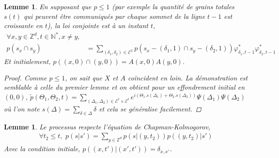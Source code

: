 \documentclass{article}
\newtheorem{lemma}[theorem]{Lemme}
\begin{document}
\begin{lemma}
	En supposant que $p\leq 1$ (par exemple la quantité de grains totales $s(t)$ qui peuvent être communiqués par chaque sommet de la ligne $t-1$ est croissante en $t$), la loi conjointe est à un instant $t$,
\begin{align*}
	\forall x, y\in \mathbb{Z}^d, t\in\mathbb{N}^*, x\neq y, \\p(s_x \cap s_y) &= \sum_{(\delta_1,\delta_2)\in \mathcal{E}^2} p(s_x-(\delta_1, 1) \cap s_y-(\delta_2,1))\varphi^*_{\delta_1,t-1}\varphi^*_{\delta_2,t-1}\label{1}\tag{1}
\end{align*} 
Et initialement, $p((x,0)\cap (y,0)) = A(x,0)A(y,0)$. \begin{proof}
	Comme $p\leq 1$, on sait que $X$ et $A$ coïncident en loin. 
	La démonstration est semblable à celle du premier lemme et on obtient pour un effondrement initial en $(0,0)$, $\tilde{p}(\Theta_1, \Theta_2, t)=\sum_{(\Delta_1,\Delta_2)\in \mathcal{E}^t\times\mathcal{E}^t} e^{i(\Theta_1.s(\Delta_1)+\Theta_2.s(\Delta_2))} \Psi(\Delta_1)\Psi(\Delta_2)$ où l'on note $s(\Delta) = \sum_{\delta\in \Delta}\delta$ et cela se généralise facilement.
\end{proof}
\end{lemma}

\begin{lemma}
	Le processus respecte l'équation de Chapman-Kolmogorov, 
\begin{align*}
\forall t_2\leq t, \,\,p(s|s') = \sum_{y\in\mathbb{Z}^d}p(s|(y,t_2))p((y,t_2)|s')\end{align*}
Avec la condition initiale, $p((x,t')|(x',t')) = \delta_{x, x'}$.
\end{lemma}
\end{document}
